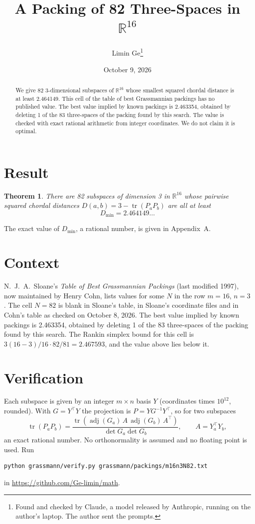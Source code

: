 \documentclass[11pt,a4paper]{article}
\title{A Packing of 82 Three-Spaces in $\mathbb{R}^{16}$}
\author{Limin Ge\thanks{Found and checked by Claude, a model released by Anthropic, running on the author's laptop. The author sent the prompts.}}
\date{October 9, 2026}
\newtheorem*{theorem}{Theorem}
\begin{document}
\maketitle
\begin{abstract}
We give 82 3-dimensional subspaces of $\mathbb{R}^{16}$ whose smallest squared chordal distance is at least 2.464149. This cell of the table of best Grassmannian packings has no published value. The best value implied by known packings is 2.463354, obtained by deleting 1 of the 83 three-spaces of the packing found by this search. The value is checked with exact rational arithmetic from integer coordinates. We do not claim it is optimal.
\end{abstract}

\section{Result}
\begin{theorem}
There are 82 subspaces of dimension 3 in $\mathbb{R}^{16}$ whose pairwise squared chordal distances $D(a,b) = 3 - \operatorname{tr}(P_aP_b)$ are all at least
\[ D_{\min} = 2.464149\ldots \]
\end{theorem}
The exact value of $D_{\min}$, a rational number, is given in Appendix~A.


\section{Context}
N.~J.~A.~Sloane's \emph{Table of Best Grassmannian Packings} (last modified 1997), now maintained by Henry Cohn, lists values for some $N$ in the row $m=16$, $n=3$. The cell $N=82$ is blank in Sloane's table, in Sloane's coordinate files and in Cohn's table as checked on October 8, 2026. The best value implied by known packings is 2.463354, obtained by deleting 1 of the 83 three-spaces of the packing found by this search. The Rankin simplex bound for this cell is $3(16-3)/16\cdot 82/81 = 2.467593$, and the value above lies below it.


\section{Verification}
Each subspace is given by an integer $m\times n$ basis $Y$ (coordinates times $10^{12}$, rounded). With $G=Y^\top Y$ the projection is $P=YG^{-1}Y^\top$, so for two subspaces
\[ \operatorname{tr}(P_aP_b)=\frac{\operatorname{tr}(\operatorname{adj}(G_a)\,A\,\operatorname{adj}(G_b)\,A^\top)}{\det G_a\det G_b},\qquad A=Y_a^\top Y_b, \]
an exact rational number. No orthonormality is assumed and no floating point is used. Run
\begin{verbatim}
python grassmann/verify.py grassmann/packings/m16n3N82.txt
\end{verbatim}
in \url{https://github.com/Ge-limin/math}.
\end{document}
